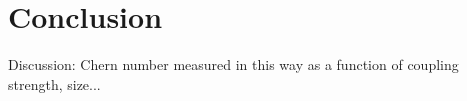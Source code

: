 \section{Conclusion}
Discussion: Chern number measured in this way as a function of coupling strength, size...
%
